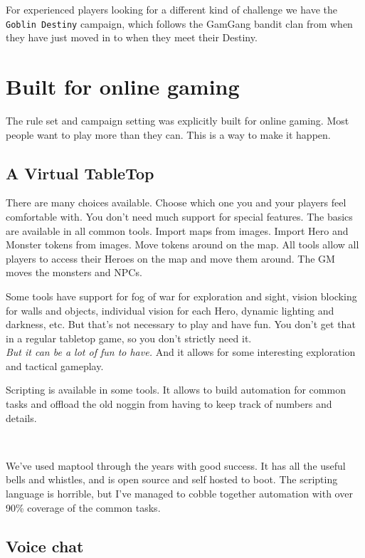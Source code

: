 For experienced players looking for a different kind of challenge we have the \texttt{Goblin Destiny} campaign, which follows the GamGang bandit clan from when they have just moved in to when they meet their Destiny.




\clearpage %

\section*{Built for online gaming}

The rule set and campaign setting was explicitly built for online gaming. Most people want to play more than they can. This is a way to make it happen.


\subsection*{A Virtual TableTop}

There are many choices available. Choose which one you and your players feel comfortable with. You don't need much support for special features. The basics are available in all common tools. Import maps from images. Import Hero and Monster tokens from images. Move tokens around on the map. All tools allow all players to access their Heroes on the map and move them around. The GM moves the monsters and NPCs. 

Some tools have support for fog of war for exploration and sight, vision blocking for walls and objects, individual vision for each Hero, dynamic lighting and darkness, etc. But that's not necessary to play and have fun. You don't get that in a regular tabletop game, so you don't strictly need it.\\
\emph{But it can be a lot of fun to have.} And it allows for some interesting exploration and tactical gameplay. 

Scripting is available in some tools. It allows to build automation for common tasks and offload the old noggin from having to keep track of numbers and details.

\

We've used maptool through the years with good success. It has all the useful bells and whistles, and is open source and self hosted to boot. The scripting language is horrible, but I've managed to cobble together automation with over 90\% coverage of the common tasks.


\subsection*{Voice chat}

